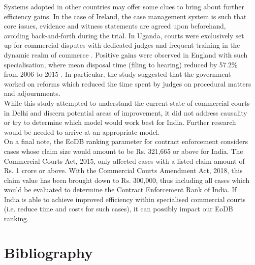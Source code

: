 \documentclass[a4paper, 12pt, twoside]{article}
\begin{document}
Systems adopted in other countries may offer some clues to bring about further efficiency gains. In the case of Ireland, the case management system is such that core issues, evidence and witness statements are agreed upon beforehand, avoiding back-and-forth during the trial. In Uganda, courts were exclusively set up for commercial disputes with dedicated judges and frequent training in the dynamic realm of commerce \parencite{ugandapaper}. Positive gains were observed in England with such specialisation, where mean disposal time (filing to hearing) reduced by 57.2\% from 2006 to 2015 \parencite{MOJUKreport}. In particular, the study suggested that the government worked on reforms which reduced the time spent by judges on procedural matters and adjournments. \\

While this study attempted to understand the current state of commercial courts in Delhi and discern potential areas of improvement, it did not address causality or try to determine which model would work best for India. Further research would be needed to arrive at an appropriate model.\\

On a final note, the EoDB ranking parameter for contract enforcement considers cases whose claim size would amount to be Rs. 321,665 or above for India. The Commercial Courts Act, 2015, only affected cases with a listed claim amount of Rs. 1 crore or above. With the Commercial Courts Amendment Act, 2018, this claim value has been brought down to Rs. 300,000, thus including all cases which would be evaluated to determine the Contract Enforcement Rank of India. If India is able to achieve improved efficiency within specialised commercial courts (i.e. reduce time and costs for such cases), it can possibly impact our EoDB ranking.

\newpage
\section*{Bibliography}
\printbibliography[heading=none] 

\newpage      
\end{document}
